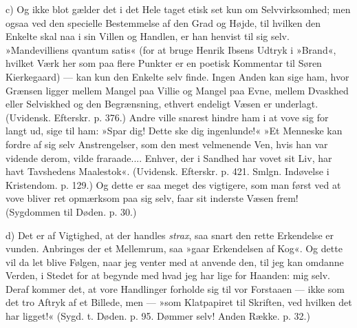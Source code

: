 \documentclass[12pt,a4paper,openany]{book}
\newcommand{\opage}[1]{\marginnote{\footnotesize\textit{[#1]}}}
\begin{document}
c) Og ikke blot gælder det i det Hele taget etisk
set kun om Selvvirksomhed; men ogsaa ved den specielle
Bestemmelse af den Grad og Højde, til hvilken den Enkelte
skal naa i sin Villen og Handlen, er han henvist til sig
selv. »Mandevilliens qvantum satis« (for at bruge Henrik
Ibsens Udtryk i »Brand«, hvilket Værk her som paa flere
Punkter er en poetisk Kommentar til Søren Kierkegaard)
--- kan kun den Enkelte selv finde. Ingen Anden kan
sige ham, hvor Grænsen ligger mellem Mangel paa Villie
og Mangel paa Evne, mellem Dvaskhed eller Selviskhed
og den Begrænsning, ethvert endeligt Væsen er underlagt.
(Uvidensk. Efterskr. p. 376.) Andre ville snarest hindre
ham i at vove sig for langt ud, sige til ham: »Spar dig!
Dette ske dig ingenlunde!« »Et Menneske kan fordre
af sig selv Anstrengelser, som den mest velmenende Ven,
hvis han var vidende derom, vilde fraraade.... Enhver,
\opage{101}der i Sandhed har vovet sit Liv, har havt Tavshedens
Maalestok«. (Uvidensk. Efterskr. p. 421. Smlgn. Indøvelse
i Kristendom. p. 129.) Og dette er saa meget des vigtigere,
som man først ved at vove bliver ret opmærksom
paa sig selv, faar sit inderste Væsen frem! (Sygdommen
til Døden. p. 30.)

d) Det er af Vigtighed, at der handles \textit{strax}, saa
snart den rette Erkendelse er vunden. Anbringes der et
Mellemrum, saa »gaar Erkendelsen af Kog«. Og dette
vil da let blive Følgen, naar jeg venter med at anvende
den, til jeg kan omdanne Verden, i Stedet for at begynde
med hvad jeg har lige for Haanden: mig selv. Deraf
kommer det, at vore Handlinger forholde sig til vor Forstaaen
--- ikke som det tro Aftryk af et Billede, men
--- »som Klatpapiret til Skriften, ved hvilken det har
ligget!« (Sygd. t. Døden. p. 95. Dømmer selv! Anden
Række. p. 32.)
\end{document}
